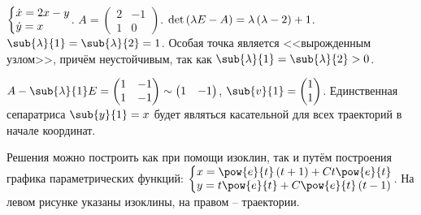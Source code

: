 \documentclass[a5paper,10pt]{article}
\begin{document}
$\tsys{\dot{x} = 2x - y \\ \dot{y} = x}$.
$A = \begin{pmatrix} 2 & -1 \\ 1 & 0 \end{pmatrix}$.
$\det\left(\hspace{0.01em}\lambda E - A\hspace{0.01em}\right) = \lambda \left(\hspace{0.01em}\lambda - 2\hspace{0.01em}\right) + 1$.
$\sub{\lambda}{1} = \sub{\lambda}{2} = 1$.
Особая точка является <<вырожденным узлом>>, причём неустойчивым, 
так как $\sub{\lambda}{1} = \sub{\lambda}{2} > 0$.

$A - \sub{\lambda}{1}E =
\begin{pmatrix} 1 & -1 \\ 1 & -1 \end{pmatrix}
\sim \begin{pmatrix} 1 & -1 \end{pmatrix}$,
 $\sub{v}{1} = \begin{pmatrix} 1 \\ 1 \end{pmatrix}$.
Единственная сепаратриса $\sub{y}{1} = x$
будет являться касательной для всех траекторий в начале координат.

Решения можно построить как при помощи изоклин, так и путём построения 
графика параметрических функций: 
$\tsys{
    x = \pow{e}{t} \br{t + 1} + C t \pow{e}{t} \\
    y = t \pow{e}{t} + C \pow{e}{t} \br{t - 1}
}$.
На левом рисунке указаны изоклины, на правом -- траектории.
\end{document}
